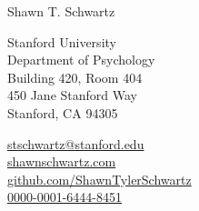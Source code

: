 {\huge Shawn T. Schwartz} %
\bigskip\medskip

Stanford University\\
Department of Psychology\\
Building 420, Room 404\\
450 Jane Stanford Way\\
Stanford, CA 94305

\medskip %

 \href{mailto:stschwartz@stanford.edu}{stschwartz@stanford.edu} \\
 \href{https://shawnschwartz.com}{shawnschwartz.com} \\
 \href{https://github.com/ShawnTylerSchwartz}{github.com/ShawnTylerSchwartz} \\
 \href{https://orcid.org/0000-0001-6444-8451}{0000-0001-6444-8451}

